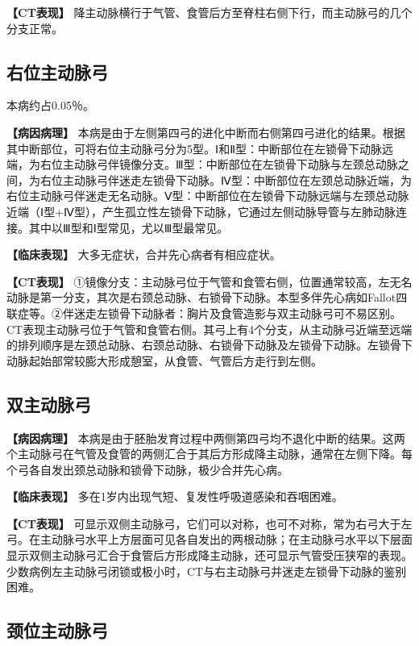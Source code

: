 \textbf{【CT表现】}
降主动脉横行于气管、食管后方至脊柱右侧下行，而主动脉弓的几个分支正常。

\subsection{右位主动脉弓}

本病约占0.05％。

\textbf{【病因病理】}
本病是由于左侧第四弓的进化中断而右侧第四弓进化的结果。根据其中断部位，可将右位主动脉弓分为5型。Ⅰ和Ⅱ型：中断部位在左锁骨下动脉远端，为右位主动脉弓伴镜像分支。Ⅲ型：中断部位在左锁骨下动脉与左颈总动脉之间，为右位主动脉弓伴迷走左锁骨下动脉。Ⅳ型：中断部位在左颈总动脉近端，为右位主动脉弓伴迷走无名动脉。Ⅴ型：中断部位在左锁骨下动脉远端与左颈总动脉近端（Ⅰ型+Ⅳ型），产生孤立性左锁骨下动脉，它通过左侧动脉导管与左肺动脉连接。其中以Ⅲ型和Ⅰ型常见，尤以Ⅲ型最常见。

\textbf{【临床表现】} 大多无症状，合并先心病者有相应症状。

\textbf{【CT表现】}
①镜像分支：主动脉弓位于气管和食管右侧，位置通常较高，左无名动脉是第一分支，其次是右颈总动脉、右锁骨下动脉。本型多伴先心病如Fallot四联症等。②伴迷走左锁骨下动脉者：胸片及食管造影与双主动脉弓可不易区别。CT表现主动脉弓位于气管和食管右侧。其弓上有4个分支，从主动脉弓近端至远端的排列顺序是左颈总动脉、右颈总动脉、右锁骨下动脉及左锁骨下动脉。左锁骨下动脉起始部常较膨大形成憩室，从食管、气管后方走行到左侧。

\subsection{双主动脉弓}

\textbf{【病因病理】}
本病是由于胚胎发育过程中两侧第四弓均不退化中断的结果。这两个主动脉弓在气管及食管的两侧汇合于其后方形成降主动脉，通常在左侧下降。每个弓各自发出颈总动脉和锁骨下动脉，极少合并先心病。

\textbf{【临床表现】} 多在1岁内出现气短、复发性呼吸道感染和吞咽困难。

\textbf{【CT表现】}
可显示双侧主动脉弓，它们可以对称，也可不对称，常为右弓大于左弓。在主动脉弓水平上方层面可见各自发出的两根动脉；在主动脉弓水平以下层面显示双侧主动脉弓汇合于食管后方形成降主动脉，还可显示气管受压狭窄的表现。少数病例左主动脉弓闭锁或极小时，CT与右主动脉弓并迷走左锁骨下动脉的鉴别困难。

\subsection{颈位主动脉弓}

